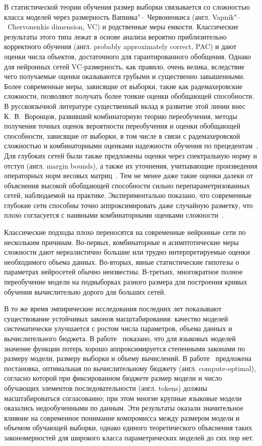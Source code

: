 В статистической теории обучения размер выборки связывается со сложностью класса моделей через размерность Вапника"--~Червоненкиса (англ. Vapnik"--~Chervonenkis dimension, VC) и родственные меры емкости. Классические результаты этого типа лежат в основе анализа вероятно приблизительно корректного обучения (англ. probably approximately correct, PAC) и дают оценки числа объектов, достаточного для гарантированного обобщения. Однако для нейронных сетей VC-размерность, как правило, очень велика, вследствие чего получаемые оценки оказываются грубыми и существенно завышенными. Более современные меры, зависящие от выборки, такие как радемахеровские сложности, позволяют получать более тонкие оценки обобщающей способности. В русскоязычной литературе существенный вклад в развитие этой линии внес К.~В.~Воронцов, развивший комбинаторную теорию переобучения, методы получения точных оценок вероятности переобучения и оценки обобщающей способности, зависящие от выборки, в том числе в связи с радемахеровской сложностью и комбинаторными оценками надежности обучения по прецедентам~\cite{vorontsov2008pria,vorontsov2010dsc,vorontsov2012overfitting}. Для глубоких сетей были также предложены оценки через спектральную норму и отступ (англ. margin bounds), а также их уточнения, учитывающие произведения операторных норм весовых матриц~\cite{bartlett2017spectral}. Тем не менее даже такие оценки далеки от объяснения высокой обобщающей способности сильно перепараметризованных сетей, наблюдаемой на практике. Экспериментально показано, что современные глубокие сети способны точно аппроксимировать даже случайную разметку, что плохо согласуется с наивными комбинаторными оценками сложности~\cite{zhang2017rethinking}.

Классические подходы плохо переносятся на современные нейронные сети по нескольким причинам. Во-первых, комбинаторные и асимптотические меры сложности дают нереалистично большие или трудно интерпретируемые оценки необходимого объема данных. Во-вторых, явные статистические гипотезы о параметрах нейросетей обычно неизвестны. В-третьих, многократное полное переобучение модели на подвыборках разного размера для построения кривых обучения вычислительно дорого для больших сетей.

В то же время эмпирические исследования последних лет показывают существование устойчивых законов масштабирования: качество моделей систематически улучшается с ростом числа параметров, объема данных и вычислительного бюджета. В работе~\cite{kaplan2020scaling} показано, что для языковых моделей значение функции потерь хорошо аппроксимируется степенными законами по размеру модели, размеру выборки и объему вычислений. В работе~\cite{hoffmann2022} предложена постановка, оптимальная по вычислительному бюджету (англ. compute-optimal), согласно которой при фиксированном бюджете размер модели и число обучающих элементов последовательности (англ. tokens) должны масштабироваться согласованно; при этом многие крупные языковые модели оказались недообученными по данным. Эти результаты оказали значительное влияние на современное понимание компромисса между размером модели и объемом обучающей выборки, однако единого теоретического объяснения таких закономерностей для широкого класса параметрических моделей до сих пор нет.

